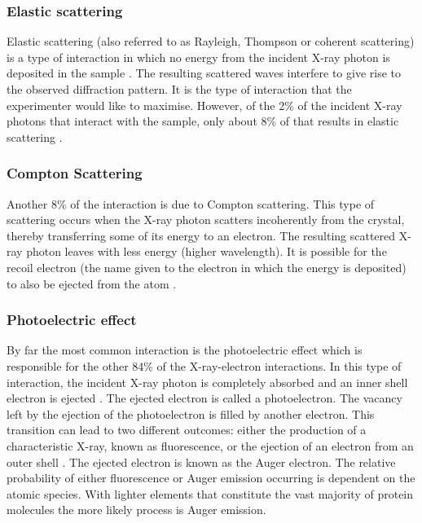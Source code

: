         \subsubsection{Elastic scattering}
        \label{subs:Elastic scattering}
            Elastic scattering (also referred to as Rayleigh, Thompson or coherent scattering) is a type of interaction in which no energy from the incident X-ray photon is deposited in the sample \cite{nave1995}.
            The resulting scattered waves interfere to give rise to the observed diffraction pattern.
            It is the type of interaction that the experimenter would like to maximise. However, of the 2\% of the incident X-ray photons that interact with the sample, only about 8\% of that results in elastic scattering \cite{ravelli2006radiation}.

        \subsubsection{Compton Scattering}
        \label{subs:Compton Scattering}
            Another 8\% of the interaction is due to Compton scattering. This type of scattering occurs when the X-ray photon scatters incoherently from the crystal, thereby transferring some of its energy to an electron.
            The resulting scattered X-ray photon leaves with less energy (higher wavelength). It is possible for the recoil electron (the name given to the electron in which the energy is deposited) to also be ejected from the atom \cite{nave1995}.

        \subsubsection{Photoelectric effect}
        \label{subs:Photoelectric effect}
            By far the most common interaction is the photoelectric effect which is responsible for the other 84\% of the X-ray-electron interactions.
            In this type of interaction, the incident X-ray photon is completely absorbed and an inner shell electron is ejected \cite{garman2010}.
            The ejected electron is called a photoelectron. The vacancy left by the ejection of the photoelectron is filled by another electron.
            This transition can lead to two different outcomes: either the production of a characteristic X-ray, known as fluorescence, or the ejection of an electron from an outer shell \cite{nave1995}.
            The ejected electron is known as the Auger electron. The relative probability of either fluorescence or Auger emission occurring is dependent on the atomic species.
            With lighter elements that constitute the vast majority of protein molecules the more likely process is Auger emission.

